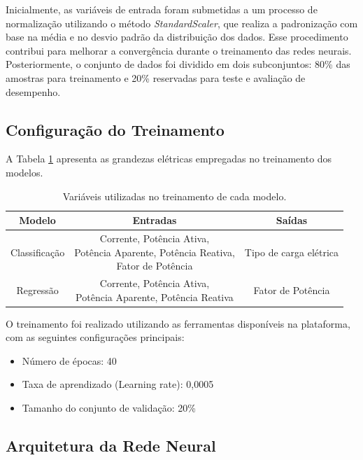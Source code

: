 Inicialmente, as variáveis de entrada foram submetidas a um processo de normalização utilizando o método \textit{StandardScaler}, que realiza a padronização com base na média e no desvio padrão da distribuição dos dados. Esse procedimento contribui para melhorar a convergência durante o treinamento das redes neurais. Posteriormente, o conjunto de dados foi dividido em dois subconjuntos: 80\% das amostras para treinamento e 20\% reservadas para teste e avaliação de desempenho.

\subsection{Configuração do Treinamento}
A Tabela \ref{tab_variaveis_modelo} apresenta as grandezas elétricas empregadas no treinamento dos modelos.

\begin{table}[!htbp]
    \centering
    \caption{Variáveis utilizadas no treinamento de cada modelo.}
    \label{tab_variaveis_modelo}
    \begin{tabular}{|c|c|c|}
    \hline
    \textbf{Modelo} & \textbf{Entradas}  & \textbf{Saídas} \\
    \hline
    Classificação & \makecell{Corrente, Potência Ativa, \\ Potência Aparente, Potência Reativa, \\ Fator de Potência} & Tipo de carga elétrica \\
    \hline
    Regressão & \makecell{Corrente, Potência Ativa, \\ Potência Aparente, Potência Reativa} & Fator de Potência \\
    \hline
    \end{tabular}
\end{table}


O treinamento foi realizado utilizando as ferramentas disponíveis na plataforma, com as seguintes configurações principais:
\begin{itemize}
    \item Número de épocas: 40
    \item Taxa de aprendizado (Learning rate): 0,0005
    \item Tamanho do conjunto de validação: 20\%
\end{itemize}

\subsection{Arquitetura da Rede Neural}

